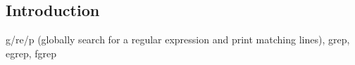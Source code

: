 
\subsection{Introduction}

g/re/p (globally search for a regular expression and print matching lines),
grep, egrep, fgrep